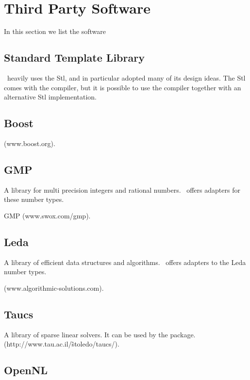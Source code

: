 \section{Third Party Software}

In this section we list the software


\subsection{Standard Template Library \label{thirdparty:stl}}

\cgal\ heavily uses the {\sc Stl}, and in particular adopted
many of its design ideas.   The {\sc Stl} comes with the compiler,
but it is possible to use the compiler together with an
alternative {\sc Stl} implementation.


\subsection{Boost \label{thirdparty:Boost}}

 (www.boost.org).


\subsection{GMP \label{thirdparty:GMP}}

A library for multi precision integers and rational numbers.
\cgal\ offers adapters for these number types.

GMP (www.swox.com/gmp).



\subsection{Leda \label{thirdparty:Leda}}

A library of efficient data structures and algorithms. \cgal\ offers
adapters to the {\sc Leda} number types.

 (www.algorithmic-solutions.com).


\subsection{Taucs \label{thirdparty:Taucs}}

A library of sparse linear solvers.
It can be used by the  package.
 (http://www.tau.ac.il/\~stoledo/taucs/).

\subsection{OpenNL \label{thirdparty:OpenNL}}

